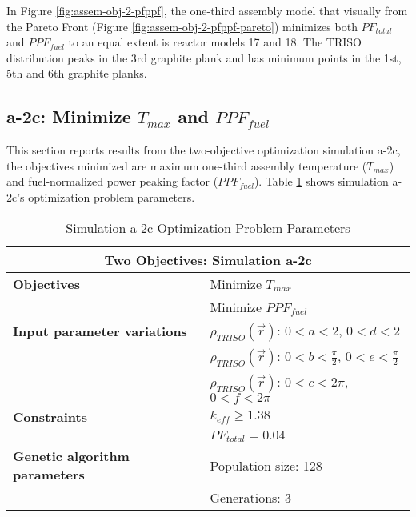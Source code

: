 In Figure \ref{fig:assem-obj-2-pfppf}, the one-third assembly model that 
visually from the Pareto Front (Figure \ref{fig:assem-obj-2-pfppf-pareto}) minimizes 
both $PF_{total}$ and $PPF_{fuel}$ to an equal extent is reactor models 17 and 18. 
The TRISO distribution peaks in the 3rd graphite plank and has minimum points in 
the 1st, 5th and 6th graphite planks. 

\subsection{a-2c: Minimize $T_{max}$ and $PPF_{fuel}$}
\label{sec:a-2c}
This section reports results from the two-objective optimization simulation a-2c, the 
objectives minimized are maximum one-third assembly temperature ($T_{max}$) and 
fuel-normalized power peaking factor ($PPF_{fuel}$).  
Table \ref{tab:simulationa2c} shows simulation a-2c's optimization problem parameters. 
\begin{table}[htbp!]
    \centering
    \onehalfspacing
    \caption{Simulation a-2c Optimization Problem Parameters}
	\label{tab:simulationa2c}
    \footnotesize
    \begin{tabular}{l|p{5.3cm}}
    \hline 
    \multicolumn{2}{c}{\textbf{Two Objectives: Simulation a-2c}} \\
    \hline 
    \textbf{Objectives} & Minimize $T_{max}$ \\
    & Minimize $PPF_{fuel}$ \\
    \hline 
    \textbf{Input parameter variations}
    & $\rho_{TRISO}(\vec{r})$: $0<a<2$, $0<d<2$\\
    & $\rho_{TRISO}(\vec{r})$: $0<b<\frac{\pi}{2}$, $0<e<\frac{\pi}{2}$\\
    & $\rho_{TRISO}(\vec{r})$: $0<c<2\pi$, $0<f<2\pi$\\
    \hline
    \textbf{Constraints} & $k_{eff} \geq 1.38$\\ 
    & $PF_{total} = 0.04$\\
    \hline 
    \textbf{Genetic algorithm parameters} & Population size: 128 \\
    & Generations: 3 \\
    \hline
    \end{tabular}
\end{table}

